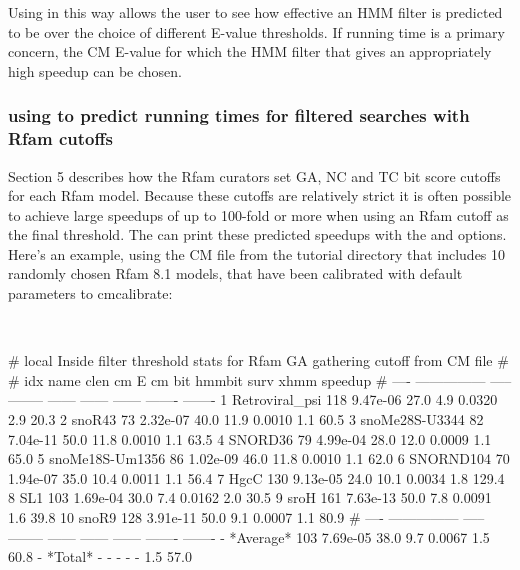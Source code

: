 Using  in this way allows the user to see how effective
an HMM filter is predicted to be over the choice of different E-value
thresholds. If running time is a primary concern, the CM E-value for
which the HMM filter that gives an appropriately high speedup can be
chosen. 

\subsubsection{using  to predict running times for
  filtered searches with Rfam cutoffs}
Section 5 describes how the Rfam curators set GA, NC and TC bit score
cutoffs for each Rfam model. Because these cutoffs are relatively
strict it is often possible to achieve large speedups of up to
100-fold or more when using an Rfam cutoff as the final threshold. The
 can print these predicted speedups with the  and  options. Here's an example, using the
 CM file from the tutorial directory that includes
10 randomly chosen Rfam 8.1 models, that have been calibrated with
default parameters to cmcalibrate:

\\

\begin{sreoutput}
# local Inside filter threshold stats for Rfam GA gathering cutoff from CM file
#
#  idx  name              clen      cm E  cm bit  hmmbit    surv     xhmm  speedup
# ----  ---------------  -----  --------  ------  ------  ------  -------  -------
     1  Retroviral_psi     118  9.47e-06    27.0     4.9  0.0320      2.9     20.3
     2  snoR43              73  2.32e-07    40.0    11.9  0.0010      1.1     60.5
     3  snoMe28S-U3344      82  7.04e-11    50.0    11.8  0.0010      1.1     63.5
     4  SNORD36             79  4.99e-04    28.0    12.0  0.0009      1.1     65.0
     5  snoMe18S-Um1356     86  1.02e-09    46.0    11.8  0.0010      1.1     62.0
     6  SNORND104           70  1.94e-07    35.0    10.4  0.0011      1.1     56.4
     7  HgcC               130  9.13e-05    24.0    10.1  0.0034      1.8    129.4
     8  SL1                103  1.69e-04    30.0     7.4  0.0162      2.0     30.5
     9  sroH               161  7.63e-13    50.0     7.8  0.0091      1.6     39.8
    10  snoR9              128  3.91e-11    50.0     9.1  0.0007      1.1     80.9
# ----  ---------------  -----  --------  ------  ------  ------  -------  -------
     -  *Average*          103  7.69e-05    38.0     9.7  0.0067      1.5     60.8
     -  *Total*              -         -       -       -       -      1.5     57.0
\end{sreoutput}

